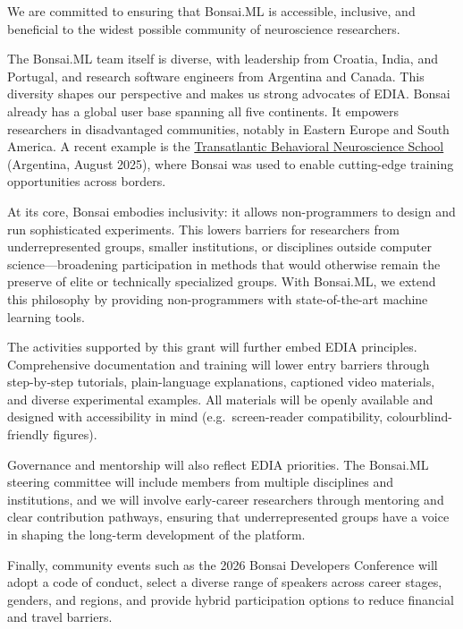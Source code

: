 We are committed to ensuring that Bonsai.ML is accessible, inclusive, and 
beneficial to the widest possible community of neuroscience researchers.

The Bonsai.ML team itself is diverse, with leadership from Croatia, India, and
Portugal, and research software engineers from Argentina and Canada.  This
diversity shapes our perspective and makes us strong advocates of EDIA.  Bonsai
already has a global user base spanning all five continents. It empowers
researchers in disadvantaged communities, notably in Eastern Europe and South
America. A recent example is the
\href{https://nenckiopenlab.org/tbns2025/}{Transatlantic Behavioral
Neuroscience School} (Argentina, August 2025), where Bonsai was used to enable
cutting-edge training opportunities across borders.

At its core, Bonsai embodies inclusivity: it allows non-programmers to design 
and run sophisticated experiments. This lowers barriers for researchers from 
underrepresented groups, smaller institutions, or disciplines outside computer 
science---broadening participation in methods that would otherwise remain the 
preserve of elite or technically specialized groups. With Bonsai.ML, we extend 
this philosophy by providing non-programmers with state-of-the-art machine 
learning tools.

The activities supported by this grant will further embed EDIA principles. 
Comprehensive documentation and training will lower entry barriers through 
step-by-step tutorials, plain-language explanations, captioned video materials, 
and diverse experimental examples. All materials will be openly available and 
designed with accessibility in mind (e.g.\ screen-reader compatibility, 
colourblind-friendly figures).

Governance and mentorship will also reflect EDIA priorities. The Bonsai.ML
steering committee will include members from multiple disciplines and
institutions, and we will involve early-career researchers through mentoring
and clear contribution pathways, ensuring that underrepresented groups have a
voice in shaping the long-term development of the platform.

Finally, community events such as the 2026 Bonsai Developers Conference will 
adopt a code of conduct, select a diverse range of speakers across career 
stages, genders, and regions, and provide hybrid participation options to reduce 
financial and travel barriers.

